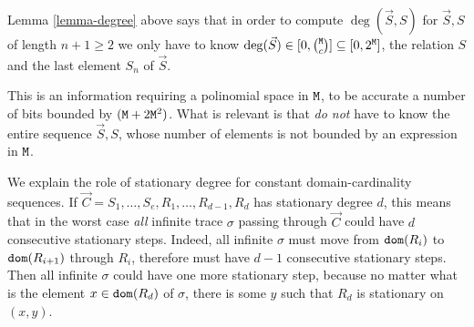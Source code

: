\documentclass{lmcs}
\newtheorem{definition}[theorem]{Definition}
\begin{document}
Lemma \ref{lemma-degree} above says that in order to compute $\deg(\vec{S},S)$ for 
$\vec{S},S$ of length $n+1 \ge 2$ we only have to know 
$\deg(\vec{S}) \in [0,\newton{\MaxInd}{c}] \subseteq [0,2^\MaxInd]$, the relation $S$ 
and the last element $S_n$ of $\vec{S}$. 

This is an information requiring a polinomial space in ${\tt M}$, to be accurate a number of
bits bounded by  $({\tt M} + 2{\tt M}^2)$.
What is relevant is that \emph{do not} have to know the entire sequence $\vec{S},S$, 
whose number of elements is not bounded by an expression in ${\tt M}$. 

%
%
%
%

%

We explain the role of stationary degree for constant domain-cardinality sequences. 
If $\vec{C}= S_1, \ldots, S_e, R_1, \ldots, R_{d-1}, R_d$ 
has stationary degree $d$, this means that in the worst case \emph{all} infinite trace $\sigma$
passing through $\vec{C}$ could have $d$ consecutive stationary steps.
Indeed, all infinite $\sigma$ must move from ${\tt dom}(R_i)$ to ${\tt dom}(R_{i+1})$ through $R_i$, 
therefore must have $d-1$ consecutive stationary steps. 
Then all infinite $\sigma$ could have one more stationary step, because no matter what is 
the element $x \in {\tt dom}(R_d)$ of $\sigma$, there is some $y$ such that $R_d$ is stationary 
on $(x,y)$.
\end{document}
